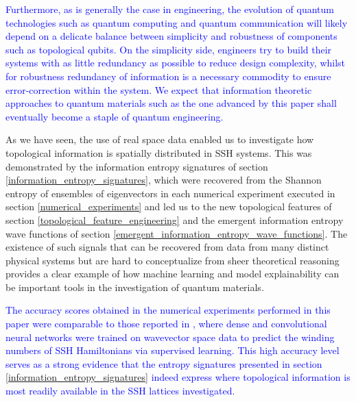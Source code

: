 \documentclass[10pt]{revtex4-1}
\newcommand{\citequote}[1]{\ref{#1}}
\begin{document}
\textcolor{blue}{
Furthermore, as is generally the case in engineering, the evolution of quantum technologies such as quantum computing and quantum communication  will likely depend on a delicate balance between simplicity and robustness of components such as topological qubits. On the simplicity side, engineers try to build their systems with as little redundancy as possible to reduce design complexity, whilst for robustness redundancy of information is a necessary commodity to ensure error-correction within the system. We expect that information theoretic approaches to quantum materials such as the one advanced by this paper shall eventually become a staple of quantum engineering.  
}

As we have seen, the use of real space data enabled us to investigate how topological information is spatially distributed in SSH systems. This was demonstrated by the information entropy signatures of section \ref{information_entropy_signatures}, which were recovered from the Shannon entropy of ensembles of eigenvectors in each numerical experiment executed in section \ref{numerical_experiments} and led us to the new topological features of section \ref{topological_feature_engineering} and the emergent information entropy wave functions of section \ref{emergent_information_entropy_wave_functions}. The existence of such signals that can be recovered from data from many distinct physical systems but are hard to conceptualize from sheer theoretical reasoning provides a clear example of how machine learning and model explainability can be important tools in the investigation of quantum materials.

\textcolor{blue}{The accuracy scores obtained in the numerical experiments performed in this paper were comparable to those reported in \cite{PhysRevLett.120.066401}, where dense and convolutional neural networks were trained on wavevector space data to predict the winding numbers of SSH Hamiltonians via supervised learning. This high accuracy level serves as a strong evidence that the entropy signatures presented in section \ref{information_entropy_signatures} indeed express where topological information is most readily available in the SSH lattices investigated.}%
\end{document}
